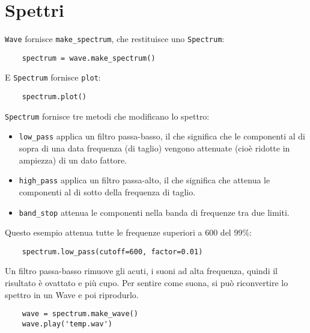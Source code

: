 \documentclass[12pt]{book} \usepackage[width=5.5in,height=8.5in, hmarginratio=3:2,vmarginratio=1:1]{geometry}
\begin{document}
\section{Spettri} \label{spectrums} 

{\tt Wave} fornisce \verb"make_spectrum", che restituisce uno {\tt Spectrum}:

\begin{verbatim} 
    spectrum = wave.make_spectrum()
 \end{verbatim} 

E {\tt Spectrum} fornisce {\tt plot}:

\begin{verbatim} 
    spectrum.plot()
 \end{verbatim} 

{\tt Spectrum} fornisce tre metodi che modificano lo spettro:

\begin{itemize} 

\item \verb"low_pass" applica un filtro passa-basso, il che significa che le componenti al di sopra di una data frequenza (di taglio) vengono attenuate (cioè ridotte in ampiezza) di un dato fattore.

\item \verb"high_pass" applica un filtro passa-alto, il che significa che attenua le componenti al di sotto della frequenza di taglio.

\item \verb"band_stop" attenua le componenti nella banda di frequenze tra due limiti.

\end{itemize} 

Questo esempio attenua tutte le frequenze superiori a 600 del 99\%:

\begin{verbatim} 
    spectrum.low_pass(cutoff=600, factor=0.01)
 \end{verbatim} 

Un filtro passa-basso rimuove gli acuti, i suoni ad alta frequenza, quindi il risultato è ovattato e più cupo. Per sentire come suona, si può riconvertire lo spettro in un Wave e poi riprodurlo.

\begin{verbatim} 
    wave = spectrum.make_wave()
    wave.play('temp.wav')
 \end{verbatim} 
\end{document}

